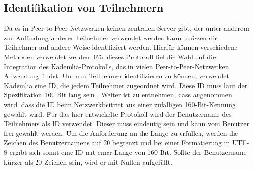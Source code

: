 \subsection{Identifikation von Teilnehmern}
\label{subsec:identifikation_von_teilnehmern}


\noindent Da es in Peer-to-Peer-Netzwerken keinen zentralen Server gibt, der unter anderem zur Auffindung anderer Teilnehmer verwendet werden kann, müssen die Teilnehmer auf andere Weise identifiziert werden. Hierfür können verschiedene Methoden verwendet werden. Für dieses Protokoll fiel die Wahl auf die Integration des Kademlia-Protokolls, das in vielen Peer-to-Peer-Netzwerken Anwendung findet. Um nun Teilnehmer identifizieren zu können, verwendet Kademlia eine ID, die jedem Teilnehmer zugeordnet wird. Diese ID muss laut der Spezifikation 160 Bit lang sein \Parencite[S. 2]{Maymounkov_Kademlia}. Weiter ist zu entnehmen, dass angenommen wird, dass die ID beim Netzwerkbeitritt aus einer zufälligen 160-Bit-Kennung gewählt wird. Für das hier entwickelte Protokoll wird der Benutzername des Teilnehmers als ID verwendet. Dieser muss eindeutig sein und kann vom Benutzer frei gewählt werden. Um die Anforderung an die Länge zu erfüllen, werden die Zeichen des Benutzernamens auf 20 begrenzt und bei einer Formatierung in UTF-8 ergibt sich somit eine ID mit einer Länge von 160 Bit. Sollte der Benutzername kürzer als 20 Zeichen sein, wird er mit Nullen aufgefüllt.
